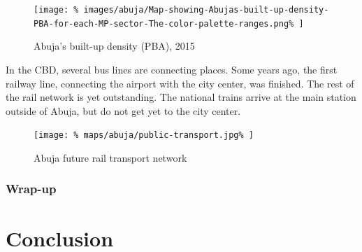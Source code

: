 \documentclass[twocolumn]{article}
\begin{document}
			\begin{figure}[h!]
				\texttt{[image: \%
					images/abuja/Map-showing-Abujas-built-up-density-PBA-for-each-MP-sector-The-color-palette-ranges.png\%
				]}
				\caption{Abuja's built-up density (PBA), 2015\cite{ResearchGate:AbujaDensity}}
				\label{fig:images:abuja-density}
			\end{figure}
			
			In the CBD, several bus lines are connecting places. Some years ago, the first railway line, connecting the airport with the city center, was finished.
			The rest of the rail network is yet outstanding. The national trains arrive at the main station outside of Abuja, but do not get yet to the city center.
			
			\begin{figure}[h!]
				\texttt{[image: \%
					maps/abuja/public-transport.jpg\%
				]}
				\caption{Abuja future rail transport network\cite{NairalandForum:AbujaMap}}
				\label{fig:map:abuja-future-rail-network}
			\end{figure}			
			
			
			\subsubsection{Wrap-up}
			
			


	\clearpage
	\section{Conclusion}
\end{document}
